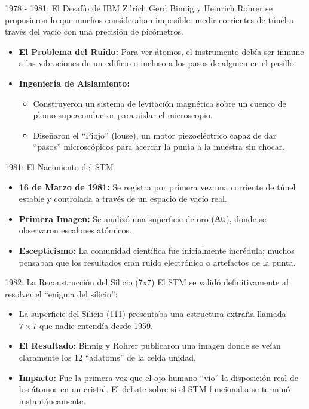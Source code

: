 \begin{frame}{1978 - 1981: El Desafío de IBM Zúrich}
  Gerd Binnig y Heinrich Rohrer se propusieron lo que muchos consideraban
  imposible: medir corrientes de túnel a través del vacío con una precisión de
  picómetros.
  \begin{itemize}
    \item \textbf{El Problema del Ruido:} Para ver átomos, el instrumento debía
      ser inmune a las vibraciones de un edificio o incluso a los pasos de
      alguien en el pasillo.
    \item \textbf{Ingeniería de Aislamiento:}
      \begin{itemize}
        \item Construyeron un sistema de levitación magnética sobre un cuenco de
          plomo superconductor para aislar el microscopio.
        \item Diseñaron el ``Piojo'' (louse), un motor piezoeléctrico capaz de
          dar ``pasos'' microscópicos para acercar la punta a la muestra sin
          chocar.
      \end{itemize}
  \end{itemize}
\end{frame}

\begin{frame}{1981: El Nacimiento del STM}
  \begin{itemize}
    \item \textbf{16 de Marzo de 1981:} Se registra por primera vez una
      corriente de túnel estable y controlada a través de un espacio de vacío
      real.
    \item \textbf{Primera Imagen:} Se analizó una superficie de oro ($\ce{Au}$),
      donde se observaron escalones atómicos.
    \item \textbf{Escepticismo:} La comunidad científica fue inicialmente
      incrédula; muchos pensaban que los resultados eran ruido electrónico o
      artefactos de la punta.
  \end{itemize}
\end{frame}

\begin{frame}{1982: La Reconstrucción del Silicio (7x7)}
  El STM se validó definitivamente al resolver el ``enigma del silicio'':
  \begin{itemize}
    \item La superficie del Silicio (111) presentaba una estructura extraña
      llamada $7 \times 7$ que nadie entendía desde 1959.
    \item \textbf{El Resultado:} Binnig y Rohrer publicaron una imagen donde se
      veían claramente los 12 ``adatoms'' de la celda unidad.
    \item \textbf{Impacto:} Fue la primera vez que el ojo humano ``vio'' la
      disposición real de los átomos en un cristal. El debate sobre si el STM
      funcionaba se terminó instantáneamente.
  \end{itemize}
\end{frame}

